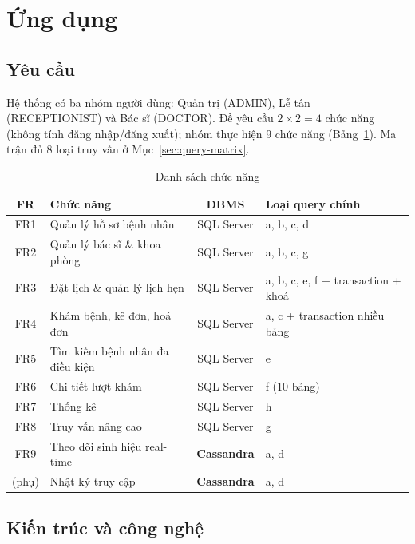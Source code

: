 \section{Ứng dụng}
\label{sec:app}

\subsection{Yêu cầu}
Hệ thống có ba nhóm người dùng: Quản trị (ADMIN), Lễ tân (RECEPTIONIST) và Bác sĩ (DOCTOR). Đề yêu cầu $2 \times 2 = 4$ chức năng (không tính đăng nhập/đăng xuất); nhóm thực hiện 9 chức năng (Bảng~\ref{tab:fr}). Ma trận đủ 8 loại truy vấn ở Mục~\ref{sec:query-matrix}.

\begin{table}[H]
\centering
\caption{Danh sách chức năng}
\label{tab:fr}
\begin{tabularx}{\linewidth}{|c|X|c|p{4.6cm}|}
\hline
\textbf{FR} & \textbf{Chức năng} & \textbf{DBMS} & \textbf{Loại query chính} \\ \hline
FR1 & Quản lý hồ sơ bệnh nhân & SQL Server & a, b, c, d \\ \hline
FR2 & Quản lý bác sĩ \& khoa phòng & SQL Server & a, b, c, g \\ \hline
FR3 & Đặt lịch \& quản lý lịch hẹn & SQL Server & a, b, c, e, f + transaction + khoá \\ \hline
FR4 & Khám bệnh, kê đơn, hoá đơn & SQL Server & a, c + transaction nhiều bảng \\ \hline
FR5 & Tìm kiếm bệnh nhân đa điều kiện & SQL Server & e \\ \hline
FR6 & Chi tiết lượt khám & SQL Server & f (10 bảng) \\ \hline
FR7 & Thống kê & SQL Server & h \\ \hline
FR8 & Truy vấn nâng cao & SQL Server & g \\ \hline
FR9 & Theo dõi sinh hiệu real-time & \textbf{Cassandra} & a, d \\ \hline
(phụ) & Nhật ký truy cập & \textbf{Cassandra} & a, d \\ \hline
\end{tabularx}
\end{table}

\subsection{Kiến trúc và công nghệ}

